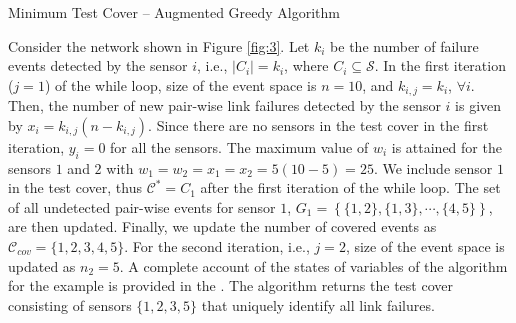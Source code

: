 \documentclass[twocolumn]{autart}
\newcommand{\algrule}[1][.2pt]{\par\vskip.5\baselineskip\hrule height #1\par\vskip.5\baselineskip}
\begin{document}
\begin{algorithm}
\small
\label{algo:fast}
\caption{Minimum Test Cover -- Augmented Greedy Algorithm}\label{euclid}
\end{algorithm}

\begin{exmp}
Consider the network shown in Figure \ref{fig:3}. Let $k_i$ be the number of failure events detected by the sensor $i$, i.e., $|C_i| = k_i$, where $C_i\subseteq\mathcal{S}$. In the first iteration ($j=1$) of the while loop, size of the event space is $n=10$, and $k_{i,j}=k_i$, $\forall i$.  
Then, the number of new pair-wise link failures detected by the sensor $i$ is given by $x_i = k_{i,j}(n - k_{i,j})$. Since there are no sensors in the test cover in the first iteration, $y_i=0$ for all the sensors. The maximum value of $w_{i}$ is attained for the sensors $1$ and $2$ with $w_1=w_2=x_1=x_2=5(10-5)=25$. We include sensor $1$ in the test cover, thus $\mathcal{C}^\ast = C_1$ after the first iteration of the while loop. The set of all undetected pair-wise events for sensor $1$, $G_1 =  \left\{\{1,2\},\{1,3\},\cdots,\{4,5\} \right\}$,  are then updated. Finally, we update the number of covered events as $\mathcal{C}_{cov}= \{1,2,3,4,5\}$. For the second iteration, i.e., $j=2$, size of the event space is updated as $n_2 = 5$.
A complete account of the states of variables of the algorithm for the example is provided in the \cite{perelman2015}.
The algorithm returns the test cover consisting of sensors $\{1,2,3,5\}$ that uniquely identify all link failures. 
\end{exmp}
\end{document}
